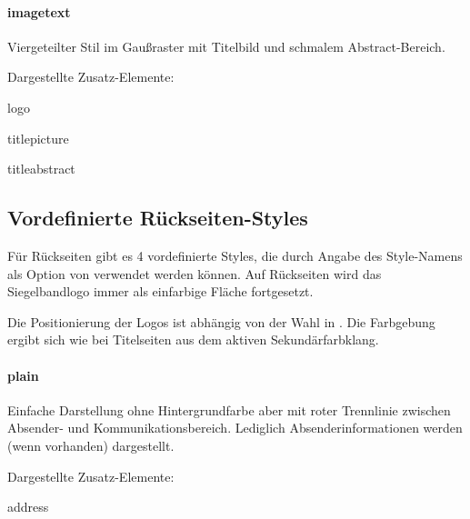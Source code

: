   \begin{minipage}[t]{0.33\textwidth}
    \null\centering\sffamily
  \end{minipage}
  \hfill
  \begin{minipage}[t]{0.6\textwidth}
    \paragraph{imagetext}
    
    Viergeteilter Stil im Gaußraster mit Titelbild und schmalem Abstract-Bereich.
    \par\bigskip
    \par\bigskip
    Dargestellte Zusatz-Elemente:
    \begin{compactitem}\ttfamily
      \item logo
      \item titlepicture
      \item titleabstract
    \end{compactitem}
  \end{minipage}

\subsection{Vordefinierte Rückseiten-Styles}\label{sec:backstyles}

Für Rückseiten gibt es 4 vordefinierte Styles, die durch Angabe des
Style-Namens als Option von  verwendet werden können.
Auf Rückseiten wird das Siegelbandlogo immer als einfarbige Fläche fortgesetzt.

Die Positionierung der Logos ist abhängig von der Wahl in .
Die Farbgebung ergibt sich wie bei Titelseiten aus dem aktiven Sekundärfarbklang.

  \begin{minipage}[t]{0.33\textwidth}
    \null\centering\sffamily
  \end{minipage}%
  \hfill
  \begin{minipage}[t]{0.6\textwidth}
    \paragraph{plain}
    \par
    Einfache Darstellung ohne Hintergrundfarbe aber mit
    roter Trennlinie zwischen Absender- und Kommunikationsbereich.
    Lediglich Absenderinformationen werden (wenn vorhanden) dargestellt.
    \par\bigskip
    \par\bigskip
    Dargestellte Zusatz-Elemente:
    \begin{compactitem}\ttfamily
      \item address
    \end{compactitem}
  \end{minipage}

